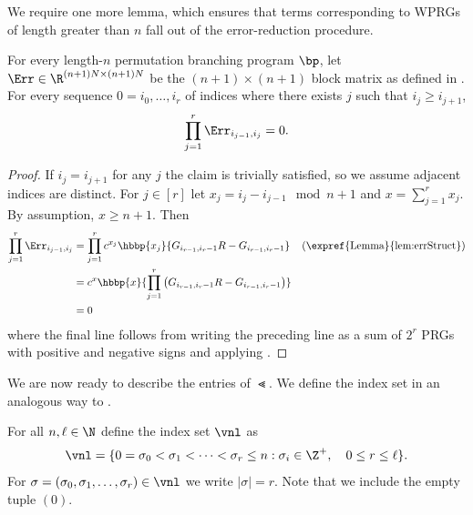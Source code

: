 \documentclass{toc}
\begin{document}
We require one more lemma, which ensures that terms corresponding to WPRGs of length greater than $n$ fall out of the %
error-reduction %
procedure. 
\begin{lemma}\label{lem:noLongCycles}
  For every length-$n$ permutation branching program $\bp$, let $\Err\in \R^{(n+1)N\times (n+1)N}$ be the $(n+1)\times(n+1)$ block matrix as defined in . For every
%
sequence $0=i_0,\ldots,i_r$ of indices %
where there exists $j$ such that $i_j\geq i_{j+1}$,
\[\prod_{j=1}^r\Err_{i_{j-1},i_j} = 0.\]
\end{lemma}
\begin{proof}
If $i_j=i_{j+1}$ for any $j$ the claim is trivially satisfied, so we assume adjacent indices are distinct.
For $j\in[r]$ let $x_j=i_{j}-i_{j-1}\mod n+1$ and $x=\sum_{j=1}^rx_j$. By assumption, $x \geq n+1$. Then 
\begin{align*}
    \prod_{j=1}^r\Err_{i_{j-1},i_j} &= \prod_{j=1}^r c^{x_j}\hbbp{x_j}{G_{i_{r-1},i_r-1}R-G_{i_{r-1},i_r-1}}
    && \text{(\expref{Lemma}{lem:errStruct})}\\
    &= c^x\hbbp{x}{\prod_{j=1}^r \left(G_{i_{r-1},i_r-1}R-G_{i_{r-1},i_r-1}\right)}\\
    &= 0%
\end{align*}
%
where %
the final line follows from writing the %
preceding %
line as a sum of $2^r$ PRGs with positive and negative %
signs %
and applying .
\end{proof}

We are now ready to describe the entries of $\Lt$. We define the index set in an analogous way to .
\begin{definition}\label{def:cycleIndex}
For all $n,\ell \in \N$ define the index set $\vnl$ as
\[\vnl = \{0 =\sigma_0< \sigma_1<\dots<\sigma_r\leq n : \sigma_i\in \Z^+, \quad 0\leq r\leq \ell\}.\]
For $\sigma =(\sigma_0,\sigma_1,\dots,\sigma_r)\in \vnl$ we write $|\sigma|=r$. Note that we include the empty tuple $(0)$.
\end{definition}
\end{document}
